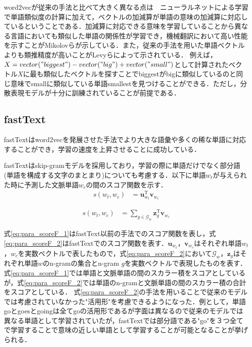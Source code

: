 word2vecが従来の手法と比べて大きく異なる点は　ニューラルネットによる学習で単語類似度の計算に加えて，ベクトルの加減算が単語の意味の加減算に対応しているということである．加減算に対応できる意味を学習していることから異なる言語においても類似した単語の関係性が学習でき，機械翻訳において高い性能を示すことがMikolovら\cite{w2vTranslate}が示している．また，従来の手法を用いた単語ベクトルよりも類推精度が高いことがLevyら\cite{levy2014neural}によって示されている．
例えば，$X=vector("biggest") - vector("big") + vector("small")$として計算されたベクトル$X$に最も類似したベクトルを探すことでbiggestがbigに類似しているのと同じ意味でsmallに類似している単語smallestを見つけることができる．ただし，分散表現モデルが十分に訓練されていることが前提である．

\subsection{fastText}
fastText\cite{fastText}\cite{fastText2}はword2vecを発展させた手法でより大きな語彙や多くの稀な単語に対応することができ，学習の速度を上昇させることに成功している．

fastTextはskip-gramモデルを採用しており，学習の際に単語だけでなく部分語(単語を構成する文字のまとまり)についても考慮する．以下に単語$w_t$が与えられた時に予測した文脈単語$w_c$の間のスコア関数を示す．
\begin{equation}
\begin{aligned}
\label{eq:para_scoreF_1}
s(w_t , w_c) & = \bm{ u }^{\mathrm{T}}_{w_t} \bm{v}_{w_c}
\end{aligned}
\end{equation}

\begin{equation}
\begin{aligned}
\label{eq:para_scoreF_2}
s(w_t , w_c) & =  \sum_{g \in \mathcal{G}_w} \bm{ z }^{\mathrm{T}}_{g} \bm{v}_{w_c}
\end{aligned}
\end{equation}

式\ref{eq:para_scoreF_1}はfastText以前の手法でのスコア関数を表し，式\ref{eq:para_scoreF_2}はfastTextでのスコア関数を表す．$\bm{u}_{w_{t}}$，$\bm{v}_{w_c}$はそれぞれ単語$w_t$，$w_c$を実数ベクトルで表したもので，式\ref{eq:para_scoreF_2}において$\mathcal{G}_w$，$\bm{z}_{g}$はそれぞれ単語$w$のn-gramの集合とn-gram $g$を実数ベクトルで表現したものを表す．
式\ref{eq:para_scoreF_1}では単語と文脈単語の間のスカラー積をスコアとしているが，式\ref{eq:para_scoreF_2}では単語のn-gramと文脈単語の間のスカラー積の合計をスコアとしている．
式\ref{eq:para_scoreF_2}の手法を用いることで従来のモデルでは考慮されていなかった"活用形"を考慮できるようになった．例として，単語 goとgoesとgoingは全てgoの活用形であるが字面は異なるので従来のモデルでは異なる単語として学習されていたが，fastTextでは部分語である"go"を３つ全てで学習することで意味の近しい単語として学習することが可能となることが挙げられる．

